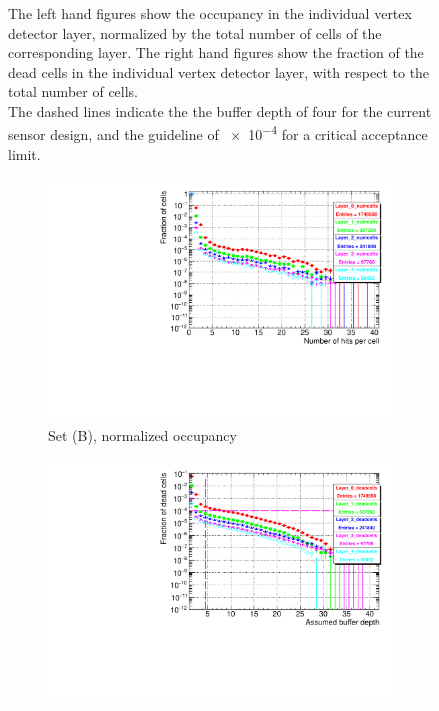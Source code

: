 \begin{figure}[htbp]
{   The left hand figures show the occupancy in the individual vertex detector layer, normalized by the total number of cells of the corresponding layer.
   The right hand figures show the fraction of the dead cells in the individual vertex detector layer, with respect to the total number of cells.
   \\The dashed lines indicate the the buffer depth of four for the current sensor design, and the guideline of \num{e-4} for a critical acceptance limit.
   }
   \label{fig:PairBkg:ILC250_Occupancy_Layers_VXDBarrel}
     \end{figure}
  \begin{figure}[htb]\ContinuedFloat
     \begin{subfigure}[b]{0.49\textwidth}
   \centering
    \includegraphics[width=\textwidth]{Figures/Pairs/Appendix/occupancy_numcells_SiVertexBarrel_ILC250_SetB_corrected_Barrel_size.pdf}
   \caption{Set (B), normalized occupancy}
   \end{subfigure}
   \hfill
    \begin{subfigure}[b]{0.49\textwidth}
   \centering
    \includegraphics[width=\textwidth]{Figures/Pairs/Appendix/occupancy_deadcells_SiVertexBarrel_ILC250_SetB_corrected_Barrel_size.pdf}

\end{subfigure}
\end{figure}
